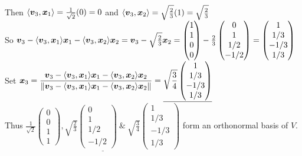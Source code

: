 \documentclass[11pt,a4paper]{article}
\begin{document}
Then $\langle \boldsymbol{v}_3, \boldsymbol{x}_1 \rangle = \frac{1}{\sqrt{2}}(0) = 0$ and $\langle \boldsymbol{v}_3, \boldsymbol{x}_2 \rangle = \sqrt{\frac{2}{3}}(1) = \sqrt{\frac{2}{3}}$\\
So $\boldsymbol{v}_3 - \langle \boldsymbol{v}_3, \boldsymbol{x}_1 \rangle\boldsymbol{x}_1 - \langle \boldsymbol{v}_3, \boldsymbol{x}_2 \rangle\boldsymbol{x}_2 = \boldsymbol{v}_3 - \sqrt{\frac{2}{3}}\boldsymbol{x}_2 = \begin{pmatrix} 1 \\ 1 \\ 0 \\ 0 \end{pmatrix} - \frac{2}{3}\begin{pmatrix} 0 \\ 1 \\ 1/2 \\ -1/2 \end{pmatrix} = \begin{pmatrix} 1 \\ 1/3 \\ -1/3 \\ 1/3 \end{pmatrix}$\\
Set $\displaystyle{\boldsymbol{x}_3 = \frac{\boldsymbol{v}_3 - \langle \boldsymbol{v}_3, \boldsymbol{x}_1 \rangle\boldsymbol{x}_1 - \langle \boldsymbol{v}_3, \boldsymbol{x}_2 \rangle\boldsymbol{x}_2}{\|\boldsymbol{v}_3 - \langle \boldsymbol{v}_3, \boldsymbol{x}_1 \rangle\boldsymbol{x}_1 - \langle \boldsymbol{v}_3, \boldsymbol{x}_2 \rangle\boldsymbol{x}_2\|} = \underline{\sqrt{\frac{3}{4}}\begin{pmatrix} 1 \\ 1/3 \\ -1/3 \\ 1/3 \end{pmatrix}}}$\\
Thus $\displaystyle{\underline{\frac{1}{\sqrt{2}} \begin{pmatrix} 0 \\ 0 \\ 1 \\ 1 \end{pmatrix}, \sqrt{\frac{2}{3}} \begin{pmatrix} 0 \\ 1 \\ 1/2 \\ -1/2 \end{pmatrix}\ \&\ \sqrt{\frac{3}{4}} \begin{pmatrix} 1 \\ 1/3 \\ -1/3 \\ 1/3 \end{pmatrix}}}$ form an orthonormal basis of $V$.\\
\end{document}
